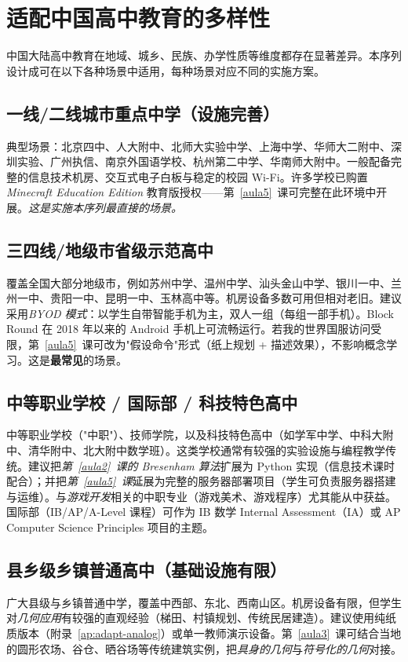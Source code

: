 \documentclass[12pt,a4paper]{scrartcl}
\newcommand{\acc}[1]{\textcolor{accent}{\textbf{#1}}}
\begin{document}
\section{适配中国高中教育的多样性}\label{sec:adapt}

中国大陆高中教育在地域、城乡、民族、办学性质等维度都存在显著差异。本序列设计成可在以下各种场景中适用，每种场景对应不同的实施方案。

\subsection{一线/二线城市重点中学（设施完善）}
典型场景：北京四中、人大附中、北师大实验中学、上海中学、华师大二附中、深圳实验、广州执信、南京外国语学校、杭州第二中学、华南师大附中。一般配备完整的信息技术机房、交互式电子白板与稳定的校园 Wi-Fi。许多学校已购置\emph{Minecraft Education Edition} 教育版授权——第~\ref{aula5}~课可完整在此环境中开展。\emph{这是实施本序列最直接的场景。}

\subsection{三四线/地级市省级示范高中}
覆盖全国大部分地级市，例如苏州中学、温州中学、汕头金山中学、银川一中、兰州一中、贵阳一中、昆明一中、玉林高中等。机房设备多数可用但相对老旧。建议采用\emph{BYOD 模式}：以学生自带智能手机为主，双人一组（每组一部手机）。Block Round 在 2018 年以来的 Android 手机上可流畅运行。若我的世界国服访问受限，第~\ref{aula5}~课可改为"假设命令"形式（纸上规划 + 描述效果），不影响概念学习。这是\acc{最常见}的场景。

\subsection{中等职业学校 / 国际部 / 科技特色高中}
中等职业学校（"中职"）、技师学院，以及科技特色高中（如学军中学、中科大附中、清华附中、北大附中数学班）。这类学校通常有较强的实验设施与编程教学传统。建议把\emph{第~\ref{aula2}~课的 Bresenham 算法}扩展为 Python 实现（信息技术课时配合）；并把\emph{第~\ref{aula5}~课}延展为完整的服务器部署项目（学生可负责服务器搭建与运维）。与\emph{游戏开发}相关的中职专业（游戏美术、游戏程序）尤其能从中获益。国际部（IB/AP/A-Level 课程）可作为 IB 数学 Internal Assessment（IA）或 AP Computer Science Principles 项目的主题。

\subsection{县乡级乡镇普通高中（基础设施有限）}
广大县级与乡镇普通中学，覆盖中西部、东北、西南山区。机房设备有限，但学生对\emph{几何应用}有较强的直观经验（梯田、村镇规划、传统民居建造）。建议使用纯纸质版本（附录~\ref{ap:adapt-analog}）或单一教师演示设备。第~\ref{aula3}~课可结合当地的圆形农场、谷仓、晒谷场等传统建筑实例，把\emph{具身的几何}与\emph{符号化的几何}对接。
\end{document}
